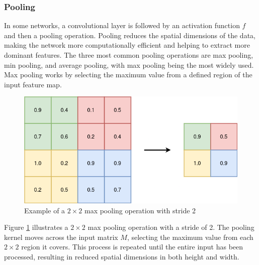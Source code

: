 \subsubsection{Pooling}
%
In some networks, a convolutional layer is followed by an activation function $f$ and then a pooling operation. Pooling reduces the spatial dimensions of the data, making the network more computationally efficient and helping to extract more dominant features.
The three most common pooling operations are max pooling, min pooling, and average pooling, with max pooling being the most widely used. Max pooling works by selecting the maximum value from a defined region of the input feature map.
\begin{figure}[!h]
\centering
\includegraphics[scale=0.4]{figures/pooling.png}
\caption{Example of a $2 \times 2$ max pooling operation with stride 2}
\label{fig:maxpool}
\end{figure}
Figure \ref{fig:maxpool} illustrates a $2 \times 2$ max pooling operation with a stride of 2. The pooling kernel moves across the input matrix $M$, selecting the maximum value from each $2 \times 2$ region it covers. This process is repeated until the entire input has been processed, resulting in reduced spatial dimensions in both height and width. 
